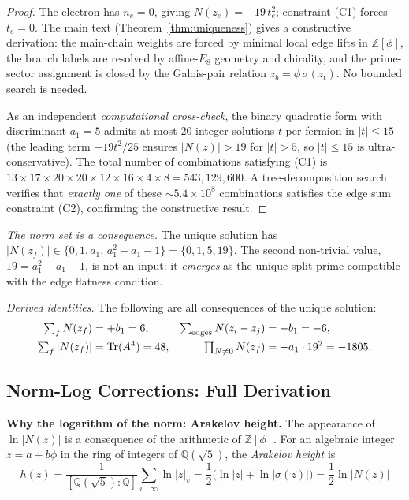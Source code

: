 \documentclass[12pt,a4paper]{article}
\theoremstyle{definition}
\begin{document}
\begin{proof}
The electron has $n_e = 0$, giving $N(z_e) = -19\,t_e^2$; constraint (C1) forces $t_e = 0$.
The main text (Theorem~\ref{thm:uniqueness}) gives a constructive derivation: the main-chain weights are forced by minimal local edge lifts in $\mathbb{Z}[\phi]$, the branch labels are resolved by affine-$E_8$ geometry and chirality, and the prime-sector assignment is closed by the Galois-pair relation $z_b = \phi\,\sigma(z_t)$.  No bounded search is needed.

As an independent \emph{computational cross-check}, the binary quadratic form with discriminant $a_1 = 5$ admits at most 20 integer solutions $t$ per fermion in $|t| \leq 15$ (the leading term $-19t^2/25$ ensures $|N(z)| > 19$ for $|t| > 5$, so $|t| \leq 15$ is ultra-conservative).
The total number of combinations satisfying (C1) is $13 \times 17 \times 20 \times 20 \times 12 \times 16 \times 4 \times 8 = 543{,}129{,}600$.
A tree-decomposition search verifies that \emph{exactly one} of these $\sim\!5.4 \times 10^8$ combinations satisfies the edge sum constraint (C2), confirming the constructive result.
\end{proof}

\noindent\textit{The norm set is a consequence.}
The unique solution has $|N(z_f)| \in \{0, 1, a_1, \, a_1^2 - a_1 - 1\} = \{0, 1, 5, 19\}$.
The second non-trivial value, $19 = a_1^2 - a_1 - 1$, is not an input: it \emph{emerges} as the unique split prime compatible with the edge flatness condition.

\noindent\textit{Derived identities.} The following are all consequences of the unique solution:
\begin{align}
\textstyle\sum_f N(z_f) &= +b_1 = 6, &
\textstyle\sum_{\text{edges}} N(z_i - z_j) &= -b_1 = -6, \\
\textstyle\sum_f |N(z_f)| &= \operatorname{Tr}(A^4) = 48, &
\textstyle\prod_{N \neq 0} N(z_f) &= -a_1 \cdot 19^2 = -1805. \notag
\end{align}

\subsection{Norm-Log Corrections: Full Derivation}

\textbf{Why the logarithm of the norm: Arakelov height.}  The appearance of $\ln|N(z)|$ is a consequence of the arithmetic of $\mathbb{Z}[\phi]$.  For an algebraic integer $z = a + b\phi$ in the ring of integers of $\mathbb{Q}(\sqrt{5})$, the \emph{Arakelov height} is
\begin{equation}
h(z) = \frac{1}{[\mathbb{Q}(\sqrt{5}):\mathbb{Q}]} \sum_{v \mid \infty} \ln|z|_v
= \frac{1}{2}\bigl(\ln|z| + \ln|\sigma(z)|\bigr)
= \frac{1}{2}\ln|N(z)|
\end{equation}
\end{document}
